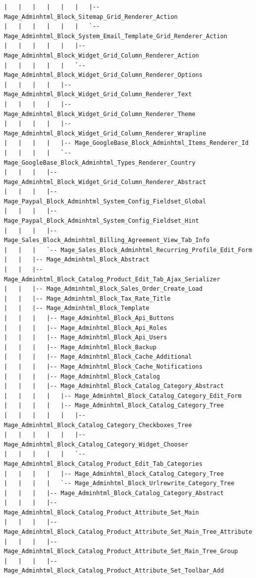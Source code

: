 \documentclass[oneside]{book}
\begin{document}
\begin{lstlisting}
|   |   |   |   |   |   |-- Mage_Adminhtml_Block_Sitemap_Grid_Renderer_Action
|   |   |   |   |   |   `-- Mage_Adminhtml_Block_System_Email_Template_Grid_Renderer_Action
|   |   |   |   |   |-- Mage_Adminhtml_Block_Widget_Grid_Column_Renderer_Action
|   |   |   |   |   `-- Mage_Adminhtml_Block_Widget_Grid_Column_Renderer_Options
|   |   |   |   |-- Mage_Adminhtml_Block_Widget_Grid_Column_Renderer_Text
|   |   |   |   |-- Mage_Adminhtml_Block_Widget_Grid_Column_Renderer_Theme
|   |   |   |   |-- Mage_Adminhtml_Block_Widget_Grid_Column_Renderer_Wrapline
|   |   |   |   |-- Mage_GoogleBase_Block_Adminhtml_Items_Renderer_Id
|   |   |   |   `-- Mage_GoogleBase_Block_Adminhtml_Types_Renderer_Country
|   |   |   |-- Mage_Adminhtml_Block_Widget_Grid_Column_Renderer_Abstract
|   |   |   |-- Mage_Paypal_Block_Adminhtml_System_Config_Fieldset_Global
|   |   |   |-- Mage_Paypal_Block_Adminhtml_System_Config_Fieldset_Hint
|   |   |   |-- Mage_Sales_Block_Adminhtml_Billing_Agreement_View_Tab_Info
|   |   |   `-- Mage_Sales_Block_Adminhtml_Recurring_Profile_Edit_Form
|   |   |-- Mage_Adminhtml_Block_Abstract
|   |   |-- Mage_Adminhtml_Block_Catalog_Product_Edit_Tab_Ajax_Serializer
|   |   |-- Mage_Adminhtml_Block_Sales_Order_Create_Load
|   |   |-- Mage_Adminhtml_Block_Tax_Rate_Title
|   |   |-- Mage_Adminhtml_Block_Template
|   |   |   |-- Mage_Adminhtml_Block_Api_Buttons
|   |   |   |-- Mage_Adminhtml_Block_Api_Roles
|   |   |   |-- Mage_Adminhtml_Block_Api_Users
|   |   |   |-- Mage_Adminhtml_Block_Backup
|   |   |   |-- Mage_Adminhtml_Block_Cache_Additional
|   |   |   |-- Mage_Adminhtml_Block_Cache_Notifications
|   |   |   |-- Mage_Adminhtml_Block_Catalog
|   |   |   |-- Mage_Adminhtml_Block_Catalog_Category_Abstract
|   |   |   |   |-- Mage_Adminhtml_Block_Catalog_Category_Edit_Form
|   |   |   |   |-- Mage_Adminhtml_Block_Catalog_Category_Tree
|   |   |   |   |   |-- Mage_Adminhtml_Block_Catalog_Category_Checkboxes_Tree
|   |   |   |   |   |-- Mage_Adminhtml_Block_Catalog_Category_Widget_Chooser
|   |   |   |   |   `-- Mage_Adminhtml_Block_Catalog_Product_Edit_Tab_Categories
|   |   |   |   |-- Mage_Adminhtml_Block_Catalog_Category_Tree
|   |   |   |   `-- Mage_Adminhtml_Block_Urlrewrite_Category_Tree
|   |   |   |-- Mage_Adminhtml_Block_Catalog_Category_Abstract
|   |   |   |-- Mage_Adminhtml_Block_Catalog_Product_Attribute_Set_Main
|   |   |   |-- Mage_Adminhtml_Block_Catalog_Product_Attribute_Set_Main_Tree_Attribute
|   |   |   |-- Mage_Adminhtml_Block_Catalog_Product_Attribute_Set_Main_Tree_Group
|   |   |   |-- Mage_Adminhtml_Block_Catalog_Product_Attribute_Set_Toolbar_Add

\end{lstlisting}
\end{document}
